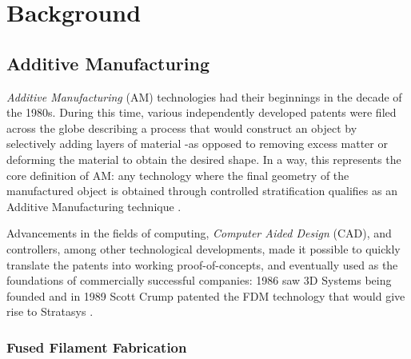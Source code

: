 \documentclass[main.tex]{subfiles}
\begin{document}
\chapter{Background}
\section{Additive Manufacturing}
\emph{Additive Manufacturing} (AM) technologies had their beginnings in the decade of the 1980s. During this time, various independently developed patents were filed across the globe describing a process that would construct an object by selectively adding layers of material -as opposed to removing excess matter or deforming the material to obtain the desired shape. In a way, this represents the core definition of AM: any technology where the final geometry of the manufactured object is obtained through controlled stratification qualifies as an Additive Manufacturing technique \cite{Gibson2015}.

Advancements in the fields of computing, \emph{Computer Aided Design} (CAD), and controllers, among other technological developments, made it possible to quickly translate the patents into working proof-of-concepts, and eventually used as the foundations of commercially successful companies: 1986 saw 3D Systems being founded and in 1989 Scott Crump patented the FDM technology that would give rise to Stratasys \cite{Gibson2015,3DSystems,Stratasys2017}. 
\subsection{Fused Filament Fabrication}
% 
%
\end{document}
